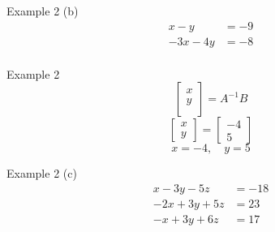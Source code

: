 \documentclass[t]{beamer}
\begin{document}
\begin{frame}{Example 2}
(b) \quad 
\begin{align*}
x - y &= -9 \\
-3x - 4y &= -8 \\
\end{align*}
\end{frame}

\begin{frame}{Example 2}
\[
\begin{bmatrix}
x \\ y \\
\end{bmatrix}
= A^{-1}B
\]
\pause \vspace{6pt}
\[
\begin{bmatrix}
x \\ y
\end{bmatrix}
= \begin{bmatrix}
-4 \\ 5
\end{bmatrix}
\]
\pause \vspace{6pt}
\[x = -4, \quad y = 5\]
\end{frame}

\begin{frame}{Example 2}
(c) \quad 
\begin{align*}
x - 3y - 5z &= -18 \\
-2x + 3y + 5z &= 23 \\
-x + 3y + 6z &= 17 \\
\end{align*}
\end{frame}
\end{document}
